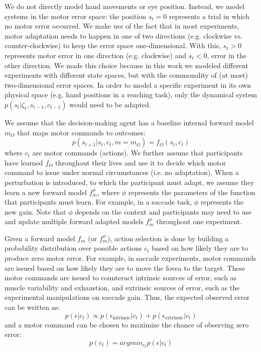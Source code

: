\documentclass[a4paper,doc,floatsintext,natbib]{apa6}%
\begin{document}
We do not directly model hand movements or eye position. Instead, we model
systems in the motor error space: the position $s_t = 0$ represents a trial in
which no motor error occurred. We make use of the fact that in most
experiments, motor adaptation needs to happen in one of two directions
(e.g. clockwise vs. counter-clockwise) to keep the error space
one-dimensional. With this, $s_t > 0$ represents motor error in one direction
(e.g. clockwise) and $s_t < 0$, error in the other direction. We made this
choice because in this work we modeled different experiments with
different state spaces, but with the commonality of (at most)
two-dimensional error spaces. In order to model a specific experiment in its
own physical space (e.g. hand positions in a reaching task), only the dynamical
system  $p(s_t | \zeta_t, s_{t-1}, c_{t-1})$ would need to be adapted.

We assume that the decision-making agent has a baseline internal forward model $m_O$ that
maps motor commands to outcomes:
\begin{equation}
p(s_{t+1} | s_t, c_t, m=m_O) = f_O(s_t, c_t)
\end{equation}
where $c_t$ are motor commands (actions). We further assume that participants
have learned $f_O$ throughout their lives and use it to decide which motor
command to issue under normal circumstances (i.e. no adaptation). When a
perturbation is introduced, to which the participant must adapt, we assume they
learn a new forward model $f_m^{\phi}$, where $\phi$ represents the parameters
of the function that participants must learn. For example, in a saccade task,
$\phi$ represents the new gain. Note that $\phi$ depends on the context and
participants may need to use and update multiple forward adapted models
$f_m^{\phi}$ throughout one experiment.

Given a forward model $f_m$ (or $f_m^\phi$), action selection is done by
building a probability distribution over possible actions $c_t$ based on how
likely they are to produce zero motor error. For example, in saccade
experiments, motor commands are issued based on how likely they are to move the
fovea to the target. These motor commands are issued to counteract intrinsic
sources of error, such as muscle variability and exhaustion, and extrinsic
sources of error, such as the experimental manipulations on saccade gain. Thus,
the expected observed error can be written as:
\begin{equation}
p(\epsilon | c_t) \propto p(\epsilon_{\text{intrinsic}} | c_t) + p(\epsilon_{\text{extrinsic}} | c_t)
\end{equation}
and a motor command can be chosen to maximize the chance of observing zero error:
\begin{equation}
p(c_t) = argmin_{c_t} p(\epsilon | c_t)
\end{equation}
\end{document}

